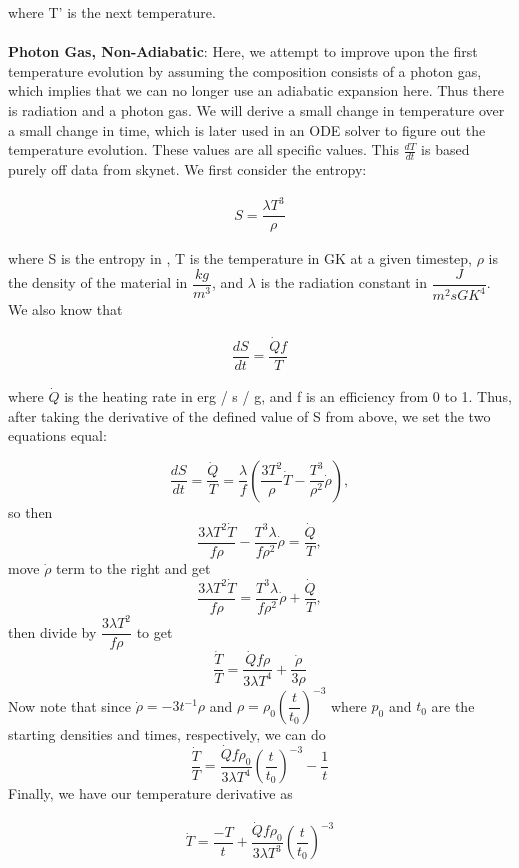 \documentclass[11pt,a4paper]{article}
\begin{document}
where T' is the next temperature. \\ \\

\textbf{Photon Gas, Non-Adiabatic}: Here, we attempt to improve upon the first temperature evolution by assuming the composition consists of a photon gas, which implies that we can no longer use an adiabatic expansion here. Thus there is radiation and a photon gas. We will derive a small change in temperature over a small change in time, which is later used in an ODE solver to figure out the temperature evolution. These values are all specific values. This $\frac{dT}{dt}$ is based purely off data from skynet. We first consider the entropy:

\begin{align}
	S = \dfrac{\lambda T^3}{\rho}
\end{align}

where S is the entropy in , T is the temperature in GK at a given timestep, $\rho$ is the density of the material in $\dfrac{kg}{m^3}$, and $\lambda$ is the radiation constant in $\dfrac{J}{m^2 s {GK}^4}$.  We also know that 

\begin{align}
	\dfrac{dS}{dt} = \dfrac{\dot{Q} f}{T}
\end{align}

where $\dot{Q}$ is the heating rate in erg / s / g, and f is an efficiency from 0 to 1. Thus, after taking the derivative of the defined value of S from above, we set the two equations equal: 

$$ \dfrac{dS}{dt} = \dfrac{\dot{Q}}{T} = \dfrac{\lambda}{f} \left(\dfrac{3T^2}{\rho}\dot{T} - \dfrac{T^3}{\rho^2}\dot{\rho} \right),$$ so then
$$ \dfrac{3 \lambda T^2 \dot{T}}{f \rho} - \dfrac{T^3 \lambda}{f \rho^2}\dot{\rho} = \dfrac{\dot{Q}}{T}, $$ move $\dot{\rho}$ term to the right and get 
$$ \dfrac{3 \lambda T^2 \dot{T}}{f \rho} = \dfrac{T^3 \lambda}{f \rho^2}\dot{\rho} + \dfrac{\dot{Q}}{T}, $$ then divide by $\dfrac{3 \lambda T^2}{f \rho} $ to get
$$ \dfrac{\dot{T}}{T} = \dfrac{\dot{Q} f \rho}{3 \lambda T^4} + \dfrac{\dot{\rho}}{3 \rho} $$ Now note that since $ \dot{\rho} = -3t^{-1} \rho $ and $ \rho = \rho_0 (\dfrac{t}{t_0})^{-3} $ where $p_0$ and $t_0$ are the starting densities and times, respectively, we can do 
$$ \dfrac{\dot{T}}{T} = \dfrac{\dot{Q} f \rho_0}{3 \lambda T^4} \left( \dfrac{t}{t_0} \right) ^{-3} - \dfrac{1}{t} $$ Finally, we have our temperature derivative as 

\begin{align}
	\dot{T} = \dfrac{-T}{t} + \dfrac{\dot{Q} f \rho_0}{3 \lambda T^3} 	\left( \dfrac{t}{t_0} \right) ^{-3} 
\end{align}
\end{document}
